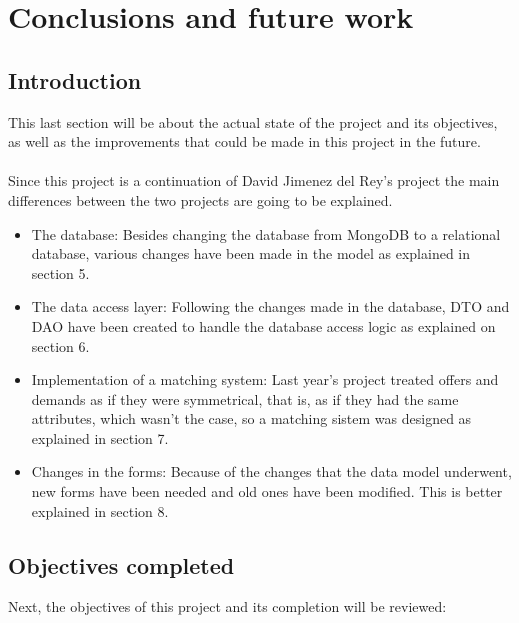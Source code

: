 \documentclass[11pt]{book}
\begin{document}
\chapter{Conclusions and future work}
\section{Introduction}
This last section will be about the actual state of the project and its objectives, as well as the improvements that could be made in this project in the future.\\\\
Since this project is a continuation of David Jimenez del Rey's project the main differences between the two projects are going to be explained.
\begin{itemize}
	\item The database: Besides changing the database from MongoDB to a relational database, various changes have been made in the model as explained in section 5.
	\item The data access layer: Following the changes made in the database, DTO and DAO have been created to handle the database access logic as explained on section 6.
	\item Implementation of a matching system: Last year's project treated offers and demands as if they were symmetrical, that is, as if they had the same attributes, which wasn't the case, so a matching sistem was designed as explained in section 7.
	\item Changes in the forms: Because of the changes that the data model underwent, new forms have been needed and old ones have been modified. This is better explained in section 8.
\end{itemize}

\section{Objectives completed}
Next, the objectives of this project and its completion will be reviewed:
\end{document}
